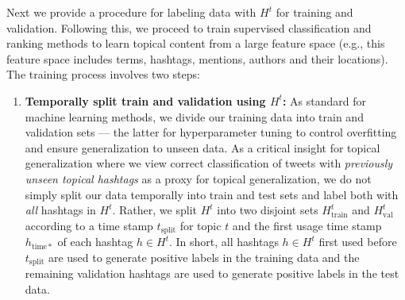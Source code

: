 Next we provide
a procedure for labeling data with $H^t$ for training and validation.
Following this, we proceed to train
supervised classification and ranking methods to learn topical content
from a large feature space (e.g., this feature space
includes terms, hashtags, mentions, authors and their locations). The
training process involves two steps:
\begin{enumerate}
\item {\bf Temporally split train and validation using $H^t$:}
As standard for machine learning methods, we divide our training data into
train and validation sets --- the latter for hyperparameter tuning to control
overfitting and ensure generalization to unseen data.  
As a critical insight for topical generalization where we view correct classification 
of tweets with \emph{previously unseen topical hashtags} as a proxy for topical generalization, 
we do not simply
split our data temporally into train and test sets and label both with \emph{all} 
hashtags in $H^t$.  Rather,
we split $H^t$ into two disjoint sets $H^t_\mathrm{train}$ and $H^t_\mathrm{val}$ 
according to a time stamp $t_\mathrm{split}$ for topic $t$ and the first usage time stamp 
$h_\mathrm{time*}$ of each hashtag $h \in H^t$.  In short, all hashtags $h \in H^t$ first used
before $t_\mathrm{split}$ are used to generate positive labels in the training data and
the remaining validation hashtags are used to generate positive labels in the test data.


\end{enumerate}
